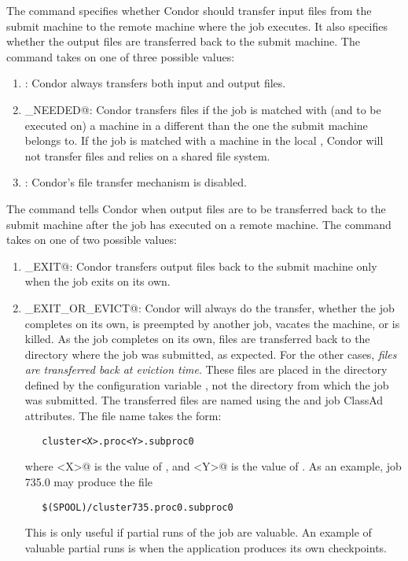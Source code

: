The  command specifies
whether Condor should
transfer input files from the submit machine to the remote machine
where the job executes.
It also specifies whether the output files are transferred 
back to the submit machine.
The command takes on one of three possible values:
\begin{enumerate}

\item \verb@YES@: Condor always transfers both input and output files.

\item \verb@IF_NEEDED@: Condor transfers files if the job is
matched with (and to be executed on) a machine in a
different  than the
one the submit machine belongs to.
If the job is matched with a machine in the local ,
Condor will not transfer files and relies
on a shared file system.

\item \verb@NO@: Condor's file transfer mechanism is disabled. 

\end{enumerate}

The  command tells Condor when output
files are to be transferred back to the submit machine after the job
has executed on a remote machine.
The command takes on one of two possible values:

\begin{enumerate}
\item \verb@ON_EXIT@: Condor transfers output files back to the submit
machine only when the job exits on its own.

\item \verb@ON_EXIT_OR_EVICT@:
Condor will always do the transfer,
whether the job completes on its own, is preempted by another job, 
vacates the machine, or is killed.
As the job completes on its own, files are transferred back
to the directory where the job was submitted, as expected.
For the other cases, \emph{files are transferred back at eviction time}.
These files are placed in
the directory defined by the configuration
variable , not the directory from which the
job was submitted.
The transferred files are named using the
 and  job ClassAd attributes. 
The file name takes the form:
\begin{verbatim}
   cluster<X>.proc<Y>.subproc0
\end{verbatim}
where \verb@<X>@ is the value of , and 
\verb@<Y>@ is the value of . 
As an example, job 735.0 may produce the file
\begin{verbatim}
   $(SPOOL)/cluster735.proc0.subproc0
\end{verbatim}

This is only useful if partial runs of the job are valuable.
An example of valuable partial runs is when the application
produces its own checkpoints.
\end{enumerate}

